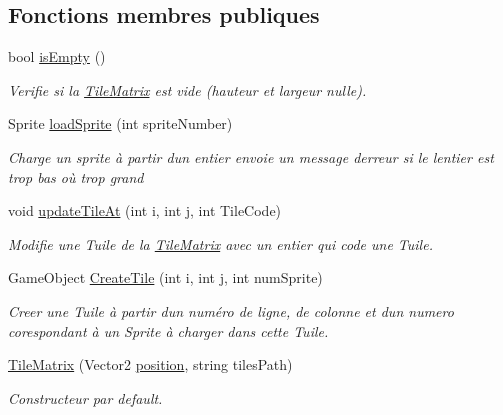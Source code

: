 \subsection*{Fonctions membres publiques}
\begin{DoxyCompactItemize}
\item 
bool \hyperlink{class_tile_matrix_a0cdc3972eeb32776a7e1e28dc14cb0de}{is\+Empty} ()
\begin{DoxyCompactList}\small\item\em Verifie si la \hyperlink{class_tile_matrix}{Tile\+Matrix} est vide (hauteur et largeur nulle). \end{DoxyCompactList}\item 
Sprite \hyperlink{class_tile_matrix_a68d291b38ca0942fbf51683f3df2f0a6}{load\+Sprite} (int sprite\+Number)
\begin{DoxyCompactList}\small\item\em Charge un sprite à partir d\textquotesingle{}un entier envoie un message d\textquotesingle{}erreur si le l\textquotesingle{}entier est trop bas où trop grand \end{DoxyCompactList}\item 
void \hyperlink{class_tile_matrix_a093a489c26d38f24eb33caca39b6d8f7}{update\+Tile\+At} (int i, int j, int Tile\+Code)
\begin{DoxyCompactList}\small\item\em Modifie une Tuile de la \hyperlink{class_tile_matrix}{Tile\+Matrix} avec un entier qui code une Tuile. \end{DoxyCompactList}\item 
Game\+Object \hyperlink{class_tile_matrix_a8a16545b24b05b208469e9d58654b916}{Create\+Tile} (int i, int j, int num\+Sprite)
\begin{DoxyCompactList}\small\item\em Creer une Tuile à partir d\textquotesingle{}un numéro de ligne, de colonne et d\textquotesingle{}un numero corespondant à un Sprite à charger dans cette Tuile. \end{DoxyCompactList}\item 
\hyperlink{class_tile_matrix_a2fd594060764e898a105c2452d75f46f}{Tile\+Matrix} (Vector2 \hyperlink{class_tile_matrix_ac005af42acbdcf02179ba2514d20f59a}{position}, string tiles\+Path)
\begin{DoxyCompactList}\small\item\em Constructeur par default. \end{DoxyCompactList}\item 

\end{DoxyCompactItemize}
